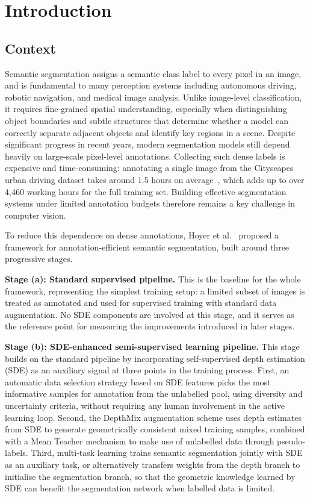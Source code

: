 \chapter{Introduction}
\label{chap:context}

\section{Context}

Semantic segmentation assigns a semantic class label to every pixel in an
image, and is fundamental to many perception systems including autonomous
driving, robotic navigation, and medical image analysis. Unlike image-level
classification, it requires fine-grained spatial understanding, especially
when distinguishing object boundaries and subtle structures that determine
whether a model can correctly separate adjacent objects and identify key
regions in a scene. Despite significant progress in recent years, modern
segmentation models still depend heavily on large-scale pixel-level
annotations. Collecting such dense labels is expensive and time-consuming:
annotating a single image from the Cityscapes urban driving dataset takes
around 1.5 hours on average~\cite{cordts2016cityscapes}, which adds up to
over 4,460 working hours for the full training set. Building effective
segmentation systems under limited annotation budgets therefore remains a
key challenge in computer vision.

To reduce this dependence on dense annotations, Hoyer et al.~\cite{hoyer2023improving}
proposed a framework for annotation-efficient semantic segmentation, built
around three progressive stages.

\textbf{Stage (a): Standard supervised pipeline.}
This is the baseline for the whole framework, representing the simplest
training setup: a limited subset of images is treated as annotated and
used for supervised training with standard data augmentation. No SDE
components are involved at this stage, and it serves as the reference
point for measuring the improvements introduced in later stages.

\textbf{Stage (b): SDE-enhanced semi-supervised learning pipeline.}
This stage builds on the standard pipeline by incorporating self-supervised
depth estimation (SDE) as an auxiliary signal at three points in the
training process. First, an automatic data selection strategy based on SDE
features picks the most informative samples for annotation from the
unlabelled pool, using diversity and uncertainty criteria, without requiring
any human involvement in the active learning loop. Second, the DepthMix
augmentation scheme uses depth estimates from SDE to generate
geometrically consistent mixed training samples, combined with a Mean
Teacher mechanism to make use of unlabelled data through pseudo-labels.
Third, multi-task learning trains semantic segmentation jointly with SDE as
an auxiliary task, or alternatively transfers weights from the depth branch
to initialise the segmentation branch, so that the geometric knowledge
learned by SDE can benefit the segmentation network when labelled data is
limited.

